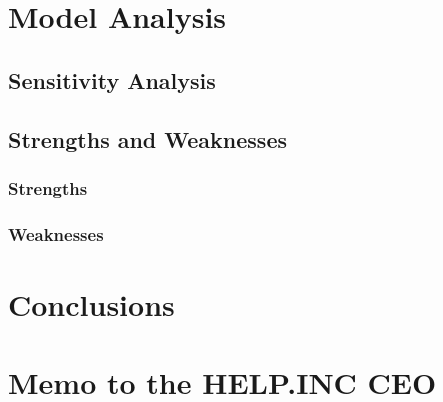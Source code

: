 \documentclass{mcmthesis}
\begin{document}
\section{Model Analysis}

\subsection{Sensitivity Analysis}


\subsection{Strengths and Weaknesses}

\subsubsection{Strengths}

\subsubsection{Weaknesses}





\section{Conclusions}



\section{Memo to the HELP.INC CEO}








\newpage
\end{document}
